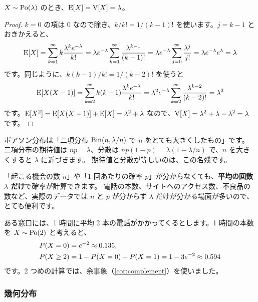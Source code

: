 \begin{theorem}
  $X \sim \mathrm{Po}(\lambda)$ のとき、$\mathrm{E}[X] = \mathrm{V}[X] = \lambda$。
\end{theorem}

\begin{proof}
  $k = 0$ の項は $0$ なので除き、$k/k! = 1/(k-1)!$ を使います。$j = k - 1$ とおきかえると、
  \[
    \mathrm{E}[X] = \sum_{k=1}^{\infty} k \frac{\lambda^k e^{-\lambda}}{k!}
    = \lambda e^{-\lambda} \sum_{k=1}^{\infty} \frac{\lambda^{k-1}}{(k-1)!}
    = \lambda e^{-\lambda} \sum_{j=0}^{\infty} \frac{\lambda^{j}}{j!}
    = \lambda e^{-\lambda} e^{\lambda} = \lambda
  \]
  です。同じように、$k(k-1)/k! = 1/(k-2)!$ を使うと
  \[
    \mathrm{E}[X(X-1)] = \sum_{k=2}^{\infty} k(k-1) \frac{\lambda^k e^{-\lambda}}{k!}
    = \lambda^2 e^{-\lambda} \sum_{k=2}^{\infty} \frac{\lambda^{k-2}}{(k-2)!} = \lambda^2
  \]
  です。$\mathrm{E}[X^2] = \mathrm{E}[X(X-1)] + \mathrm{E}[X] = \lambda^2 + \lambda$ なので、$\mathrm{V}[X] = \lambda^2 + \lambda - \lambda^2 = \lambda$ です。
\end{proof}

\begin{intuition}
  ポアソン分布は「二項分布 $\mathrm{Bin}(n, \lambda/n)$ で $n$ をとても大きくしたもの」です。
  二項分布の期待値は $np = \lambda$、分散は $np(1-p) = \lambda(1 - \lambda/n)$ で、$n$ を大きくすると $\lambda$ に近づきます。
  期待値と分散が等しいのは、この名残です。
\end{intuition}

\begin{merit}
  「起こる機会の数 $n$」や「1 回あたりの確率 $p$」が分からなくても、\textbf{平均の回数 $\lambda$ だけ}で確率が計算できます。
  電話の本数、サイトへのアクセス数、不良品の数など、実際のデータでは $n$ と $p$ が分からず $\lambda$ だけが分かる場面が多いので、とても便利です。
\end{merit}

\begin{example}[電話の本数][ex:poisson]
  ある窓口には、1 時間に平均 2 本の電話がかかってくるとします。1 時間の本数を $X \sim \mathrm{Po}(2)$ と考えると、
  \begin{align*}
    P(X = 0) &= e^{-2} \approx 0.135, \\
    P(X \ge 2) &= 1 - P(X = 0) - P(X = 1) = 1 - 3e^{-2} \approx 0.594
  \end{align*}
  です。2 つめの計算では、余事象（\cref{cor:complement}）を使いました。
\end{example}

\subsubsection*{幾何分布}

